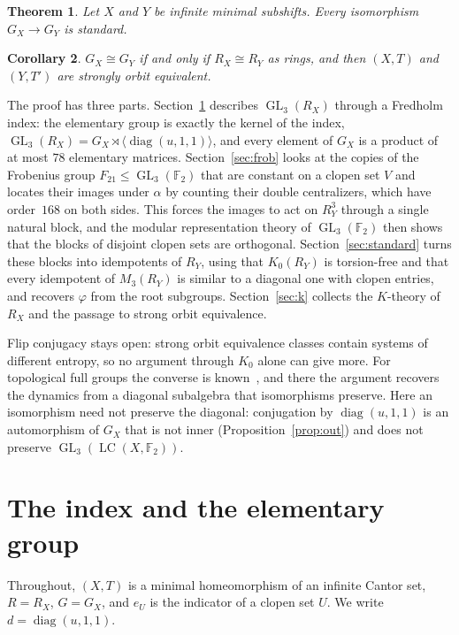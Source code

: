\documentclass[11pt]{amsart}
\newtheorem{theorem}{Theorem}[section]
\newtheorem{corollary}[theorem]{Corollary}
\theoremstyle{remark}
\newcommand{\F}{\mathbb F}
\newcommand{\LC}{\operatorname{LC}}
\newcommand{\GL}{\operatorname{GL}}
\begin{document}
\begin{theorem}\label{thm:main}
Let $X$ and $Y$ be infinite minimal subshifts. Every isomorphism
$G_X\to G_Y$ is standard.
\end{theorem}

\begin{corollary}\label{cor:soe}
$G_X\cong G_Y$ if and only if $R_X\cong R_Y$ as rings, and then $(X,T)$ and
$(Y,T')$ are strongly orbit equivalent.
\end{corollary}

The proof has three parts. Section~\ref{sec:index} describes $\GL_3(R_X)$
through a Fredholm index: the elementary group is exactly the kernel of the
index, $\GL_3(R_X)=G_X\rtimes\langle\operatorname{diag}(u,1,1)\rangle$, and
every element of $G_X$ is a product of at most $78$ elementary matrices.
Section~\ref{sec:frob} looks at the copies of the Frobenius group
$F_{21}\le\GL_3(\F_2)$ that are constant on a clopen set $V$ and locates
their images under $\alpha$ by counting their double centralizers, which
have order~$168$ on both sides. This forces the images to act on
$R_Y^3$ through a single natural block, and the modular representation
theory of $\GL_3(\F_2)$ then shows that the blocks of disjoint clopen sets
are orthogonal. Section~\ref{sec:standard} turns these blocks into
idempotents of $R_Y$, using that $K_0(R_Y)$ is torsion-free and that every
idempotent of $M_3(R_Y)$ is similar to a diagonal one with clopen entries,
and recovers $\varphi$ from the root subgroups. Section~\ref{sec:k} collects
the $K$-theory of $R_X$ and the passage to strong orbit equivalence.

Flip conjugacy stays open: strong orbit equivalence classes contain systems
of different entropy, so no argument through $K_0$ alone can give more. For
topological full groups the converse is known~\cite{GPS99,BezuglyiMedynets},
and there the argument recovers the dynamics from a diagonal subalgebra
that isomorphisms preserve. Here an isomorphism need not preserve the
diagonal: conjugation by $\operatorname{diag}(u,1,1)$ is an automorphism of
$G_X$ that is not inner (Proposition~\ref{prop:out}) and does not preserve
$\GL_3(\LC(X,\F_2))$.

\section{The index and the elementary group}\label{sec:index}

Throughout, $(X,T)$ is a minimal homeomorphism of an infinite Cantor set,
$R=R_X$, $G=G_X$, and $e_U$ is the indicator of a clopen set $U$. We write
$d=\operatorname{diag}(u,1,1)$.
\end{document}
